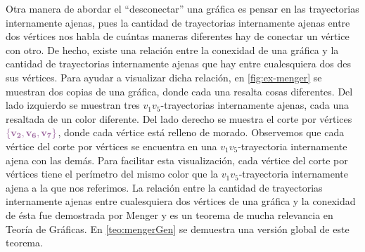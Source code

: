 Otra manera de abordar el ``desconectar'' una gr\'afica es  pensar en las
trayectorias internamente ajenas, pues la cantidad de trayectorias internamente
ajenas entre dos v\'ertices nos habla de cu\'antas maneras diferentes hay de
conectar un v\'ertice con otro. De hecho, existe una relaci\'on entre la
conexidad de una gr\'afica y la cantidad de trayectorias internamente ajenas que
hay entre cualesquiera dos des sus v\'ertices. Para ayudar a visualizar dicha
relaci\'on, en \cref{fig:ex-menger} se muestran dos copias de una gr\'afica,
donde cada una resalta cosas diferentes. Del lado izquierdo se muestran tres
$v_1v_5$-trayectorias internamente ajenas, cada una resaltada de un color
diferente. Del lado derecho se muestra el corte por v\'ertices
${\color{morado}\bf \{v_2, v_6, v_7\} }$, donde cada v\'ertice est\'a relleno de
morado. Observemos que cada v\'ertice del corte por v\'ertices se encuentra en
una $v_1v_5$-trayectoria internamente ajena con las dem\'as. Para facilitar esta
visualizaci\'on, cada v\'ertice del corte por v\'ertices tiene el per\'imetro
del mismo color que la $v_1v_5$-trayectoria internamente ajena a la que nos
referimos. La relaci\'on entre la cantidad de trayectorias internamente ajenas
entre cualesquiera dos v\'ertices de una gr\'afica y la conexidad de \'esta fue
demostrada por Menger y es un teorema de mucha relevancia en Teor\'ia de
Gr\'aficas. En \cref*{teo:mengerGen} se demuestra una versi\'on global de este
teorema. 

